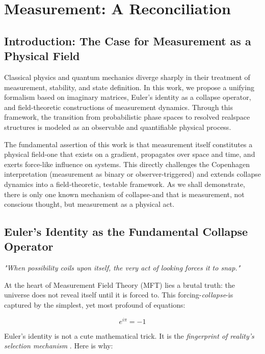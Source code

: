 \chapter{Measurement: A Reconciliation}

\section{Introduction: The Case for Measurement as a Physical Field}

Classical physics and quantum mechanics diverge sharply in their treatment of measurement, stability, and state definition. In this work, we propose a unifying formalism based on imaginary matrices, Euler's identity as a collapse operator, and field-theoretic constructions of measurement dynamics. Through this framework, the transition from probabilistic phase spaces to resolved realspace structures is modeled as an observable and quantifiable physical process.

The fundamental assertion of this work is that measurement itself constitutes a physical field-one that exists on a gradient, propagates over space and time, and exerts force-like influence on systems. This directly challenges the Copenhagen interpretation (measurement as binary or observer-triggered) and extends collapse dynamics into a field-theoretic, testable framework. As we shall demonstrate, there is only one known mechanism of collapse-and that is measurement, not conscious thought, but measurement as a physical act.

\section{Euler's Identity as the Fundamental Collapse Operator}

\begin{flushright}
  {\itshape "When possibility coils upon itself, the very act of looking forces it to snap."}
\end{flushright}

At the heart of Measurement Field Theory (MFT) lies a brutal truth: the universe does not reveal itself until it is forced to. This forcing-\emph{collapse}-is captured by the simplest, yet most profound of equations:

\begin{equation}\label{eq:euler}
  e^{i\pi} = -1
\end{equation}

Euler's identity is not a cute mathematical trick. It is the \emph{fingerprint of reality's selection mechanism} \cite{gothen_eulers_2022,woit_eulers_2005,shurman_eulers_2014, angeles_role_2015}. Here is why:

